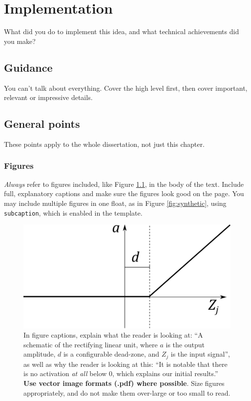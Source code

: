 \documentclass{l4proj}
\begin{document}
\chapter{Implementation}
What did you do to implement this idea, and what technical achievements did you make?
\section{Guidance}
You can't talk about everything. Cover the high level first, then cover important, relevant or impressive details.



\section{General points}

These points apply to the whole dissertation, not just this chapter.



\subsection{Figures}
\emph{Always} refer to figures included, like Figure \ref{fig:relu}, in the body of the text. Include full, explanatory captions and make sure the figures look good on the page.
You may include multiple figures in one float, as in Figure \ref{fig:synthetic}, using \texttt{subcaption}, which is enabled in the template.



\begin{figure}
    \centering
    \includegraphics[width=0.5\linewidth]{images/relu.pdf}    

    \caption{In figure captions, explain what the reader is looking at: ``A schematic of the rectifying linear unit, where $a$ is the output amplitude,
    $d$ is a configurable dead-zone, and $Z_j$ is the input signal'', as well as why the reader is looking at this: 
    ``It is notable that there is no activation \emph{at all} below 0, which explains our initial results.'' 
    \textbf{Use vector image formats (.pdf) where possible}. Size figures appropriately, and do not make them over-large or too small to read.
    }

    \label{fig:relu} 
\end{figure}
\end{document}

